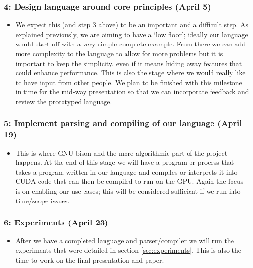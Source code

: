 \documentclass{article}
\begin{document}
\subsubsection*{4: Design language around core principles (April 5)}
\begin{itemize}
  \item We expect this (and step 3 above) to be an important and a difficult step. As explained previously, we are aiming to have a `low floor'; ideally our language would start off with a very simple complete example. From there we can add more complexity to the language to allow for more problems but it is important to keep the simplicity, even if it means hiding away features that could enhance performance. This is also the stage where we would really like to have input from other people. We plan to be finished with this milestone in time for the mid-way presentation so that we can incorporate feedback and review the prototyped language.
\end{itemize}
 
\subsubsection*{5: Implement parsing and compiling of our language (April 19)}
\begin{itemize}  
  \item This is where GNU bison and the more algorithmic part of the project happens. At the end of this stage we will have a program or process that takes a program written in our language and compiles or interprets it into CUDA code that can then be compiled to run on the GPU. Again the focus is on enabling our use-cases; this will be considered sufficient if we run into time/scope issues.
\end{itemize}

\subsubsection*{6: Experiments (April 23)}
\begin{itemize}
  \item After we have a completed language and parser/compiler we will run the experiments that were detailed in section \ref{sec:experiments}. This is also the time to work on the final presentation and paper. 
\end{itemize}
\end{document}
